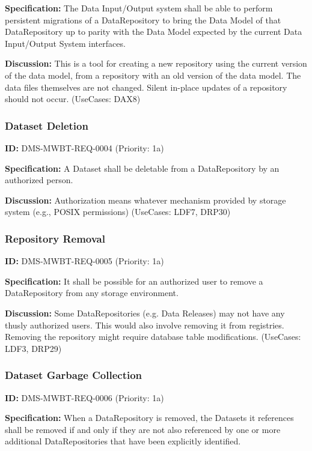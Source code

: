 \documentclass[SE,toc,lsstdraft]{lsstdoc}
\begin{document}
\textbf{Specification:}
The Data Input/Output system shall be able to perform persistent migrations of a DataRepository to bring the Data Model of that DataRepository up to parity with the Data Model expected by the current Data Input/Output System interfaces.

\textbf{Discussion:}
This is a tool for creating a new repository using the current version of the data model, from a repository with an old version of the data model. The data files themselves are not changed. Silent in-place updates of a repository should not occur. (UseCases: DAX8)

\subsubsection{Dataset Deletion}

\label{DMS-MWBT-REQ-0004}
\textbf{ID:} DMS-MWBT-REQ-0004 (Priority: 1a)

\textbf{Specification:}
A Dataset shall be deletable from a DataRepository by an authorized person.

\textbf{Discussion:}
Authorization means whatever mechanism provided by storage system (e.g., POSIX permissions) (UseCases: LDF7, DRP30)

\subsubsection{Repository Removal}

\label{DMS-MWBT-REQ-0005}
\textbf{ID:} DMS-MWBT-REQ-0005 (Priority: 1a)

\textbf{Specification:}
It shall be possible for an authorized user to remove a DataRepository from any storage environment.

\textbf{Discussion:}
Some DataRepositories (e.g. Data Releases) may not have any thusly authorized users. This would also involve removing it from registries. Removing the repository might require database table modifications. (UseCases: LDF3, DRP29)

\subsubsection{Dataset Garbage Collection}

\label{DMS-MWBT-REQ-0006}
\textbf{ID:} DMS-MWBT-REQ-0006 (Priority: 1a)

\textbf{Specification:}
When a DataRepository is removed, the Datasets it references shall be removed if and only if they are not also referenced by one or more additional DataRepositories that have been explicitly identified.
\end{document}
